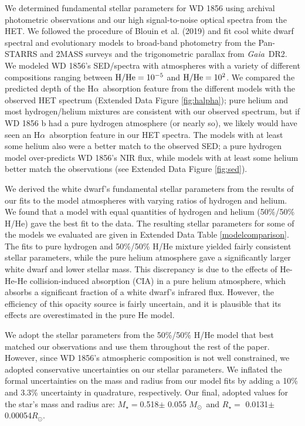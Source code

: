 \documentclass{nature3}
\newcommand{\rsun}{\ensuremath{R_\odot}}
\newcommand{\msun}{\ensuremath{M_\odot}}
\newcommand{\halpha}{H$\alpha$}
\newcommand{\project}[1]{\textsl{#1}}
\newcommand{\Gaia}{\project{Gaia}}
\begin{document}
\begin{methods}
We determined fundamental stellar parameters for WD 1856 using archival photometric observations and our high signal-to-noise optical spectra from the HET. We followed the procedure of Blouin et al. (2019)\cite{blouin} and fit cool white dwarf spectral and evolutionary models\cite{blouin2018} to broad-band photometry from the Pan-STARRS and 2MASS surveys and the trigonometric parallax from \Gaia\ DR2. We modeled WD 1856's SED/spectra with atmospheres with a variety of different compositions ranging between ${\rm H/He}=10^{-5}$ and ${\rm H/He}=10^2$. We compared the predicted depth of the \halpha\ absorption feature from the different models with the observed HET spectrum (Extended Data Figure \ref{fig:halpha}); pure helium and most hydrogen/helium mixtures are consistent with our observed spectrum, but if WD 1856 b had a pure hydrogen atmosphere (or nearly so), we likely would have seen an \halpha\ absorption feature in our HET spectra.  The models with at least some helium also were a better match to the observed SED; a pure hydrogen model over-predicts WD 1856's NIR flux, while models with at least some helium better match the observations (see Extended Data Figure \ref{fig:sed}). 

We derived the white dwarf's fundamental stellar parameters from the results of our fits to the model atmospheres with varying ratios of hydrogen and helium. We found that a model with equal quantities of hydrogen and helium (50\%/50\% H/He) gave the best fit to the data. The resulting stellar parameters for some of the models we evaluated are given in Extended Data Table \ref{modelcomparison}. The fits to pure hydrogen and 50\%/50\% H/He mixture yielded fairly consistent stellar parameters, while the pure helium atmosphere gave a significantly larger white dwarf and lower stellar mass. This discrepancy is due to the effects of He-He-He collision-induced absorption (CIA) in a pure helium atmosphere, which absorbs a significant fraction of a white dwarf's infrared flux\cite{Kowalski}. However, the efficiency of this opacity source is fairly uncertain, and it is plausible that its effects are overestimated in the pure He model.

We adopt the stellar parameters from the 50\%/50\% H/He model that best matched our observations and use them throughout the rest of the paper. However, since WD 1856's atmospheric composition is not well constrained, we adopted conservative uncertainties on our stellar parameters. We inflated the formal uncertainties on the mass and radius from our model fits by adding a 10\% and 3.3\% uncertainty in quadrature, respectively. Our final, adopted values for the star's mass and radius are: $M_\star=$0.518$\pm$ 0.055 \msun\ and $R_\star=$ 0.0131$\pm$ 0.00054\rsun. 




\end{methods}
\end{document}
